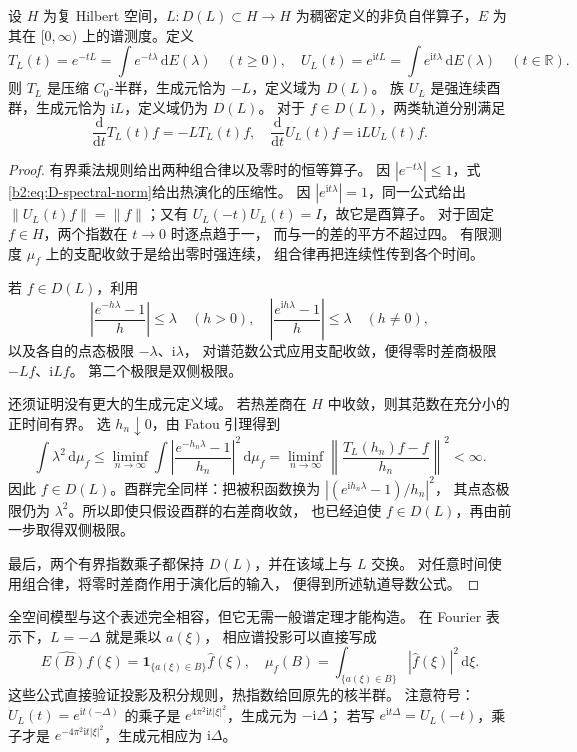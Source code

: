 \begin{proposition}[谱热半群与酉群]\label{b2:prop:D-spectral-evolutions}
设 \(H\) 为复 Hilbert 空间，\(L:D(L)\subset H\to H\) 为稠密定义的非负自伴算子，\(E\) 为其在 \([0,\infty)\) 上的谱测度。定义
\[
 T_L(t)=e^{-tL}=\int e^{-t\lambda}\,\mathrm dE(\lambda)
 \quad(t\ge0),
 \quad
 U_L(t)=e^{\mathrm itL}=\int e^{\mathrm it\lambda}\,\mathrm dE(\lambda)
 \quad(t\in\mathbb R).
\]
则 \(T_L\) 是压缩 \(C_0\)-半群，生成元恰为 \(-L\)，定义域为 \(D(L)\)。
族 \(U_L\) 是强连续酉群，生成元恰为 \(\mathrm iL\)，定义域仍为 \(D(L)\)。
对于 \(f\in D(L)\)，两类轨道分别满足
\[
 \frac{\mathrm d}{\mathrm dt}T_L(t)f=-LT_L(t)f,
 \quad
 \frac{\mathrm d}{\mathrm dt}U_L(t)f=\mathrm iLU_L(t)f.
\]
\end{proposition}
\begin{proof}
有界乘法规则给出两种组合律以及零时的恒等算子。
因 \(|e^{-t\lambda}|\le1\)，式\eqref{b2:eq:D-spectral-norm}给出热演化的压缩性。
因 \(|e^{\mathrm it\lambda}|=1\)，同一公式给出
\(\|U_L(t)f\|=\|f\|\)；又有 \(U_L(-t)U_L(t)=I\)，故它是酉算子。
对于固定 \(f\in H\)，两个指数在 \(t\to0\) 时逐点趋于一，
而与一的差的平方不超过四。
有限测度 \(\mu_f\) 上的支配收敛于是给出零时强连续，
组合律再把连续性传到各个时间。

若 \(f\in D(L)\)，利用
\[
 \left|\frac{e^{-h\lambda}-1}{h}\right|\le\lambda
 \quad(h>0),
 \quad
 \left|\frac{e^{\mathrm ih\lambda}-1}{h}\right|\le\lambda
 \quad(h\ne0),
\]
以及各自的点态极限 \(-\lambda\)、\(\mathrm i\lambda\)，
对谱范数公式应用支配收敛，便得零时差商极限 \(-Lf\)、\(\mathrm iLf\)。
第二个极限是双侧极限。

还须证明没有更大的生成元定义域。
若热差商在 \(H\) 中收敛，则其范数在充分小的正时间有界。
选 \(h_n\downarrow0\)，由 Fatou 引理得到
\[
 \int\lambda^2\,\mathrm d\mu_f
 \le\liminf_{n\to\infty}
 \int\left|\frac{e^{-h_n\lambda}-1}{h_n}\right|^2\,
               \mathrm d\mu_f
 =\liminf_{n\to\infty}
 \left\|\frac{T_L(h_n)f-f}{h_n}\right\|^2<\infty.
\]
因此 \(f\in D(L)\)。酉群完全同样：把被积函数换为
\(|(e^{\mathrm ih_n\lambda}-1)/h_n|^2\)，
其点态极限仍为 \(\lambda^2\)。所以即使只假设酉群的右差商收敛，
也已经迫使 \(f\in D(L)\)，再由前一步取得双侧极限。

最后，两个有界指数乘子都保持 \(D(L)\)，并在该域上与 \(L\) 交换。
对任意时间使用组合律，将零时差商作用于演化后的输入，
便得到所述轨道导数公式。
\end{proof}

全空间模型与这个表述完全相容，但它无需一般谱定理才能构造。
在 Fourier 表示下，\(L=-\Delta\) 就是乘以 \(a(\xi)\)，
相应谱投影可以直接写成
\[
 \widehat{E(B)f}(\xi)=\mathbf1_{\{a(\xi)\in B\}}\widehat f(\xi),
 \quad
 \mu_f(B)=\int_{\{a(\xi)\in B\}}|\widehat f(\xi)|^2\,\mathrm d\xi.
\]
这些公式直接验证投影及积分规则，热指数给回原先的核半群。
注意符号：\(U_L(t)=e^{\mathrm it(-\Delta)}\) 的乘子是
\(e^{4\pi^2\mathrm it|\xi|^2}\)，生成元为 \(-\mathrm i\Delta\)；
若写 \(e^{\mathrm it\Delta}=U_L(-t)\)，乘子才是
\(e^{-4\pi^2\mathrm it|\xi|^2}\)，生成元相应为 \(\mathrm i\Delta\)。

